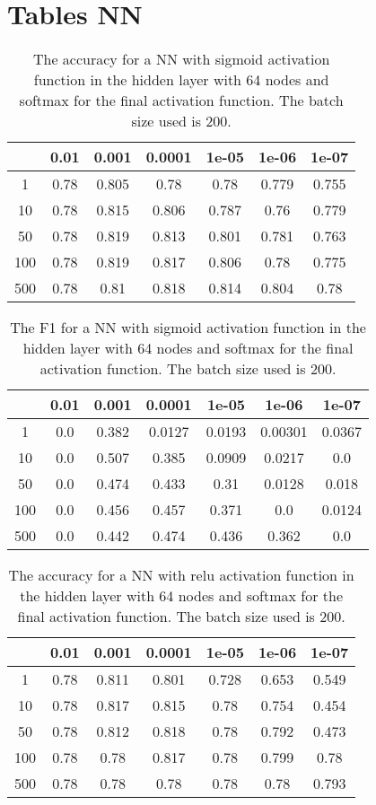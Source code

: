 \documentclass[uio,jmp,amsmath,amssymb,reprint,nofootinbib]{revtex4-1}
\numberwithin{equation}{section}
\begin{document}
\section{Tables NN}
\begin{table}[H]
\caption{The accuracy for a NN with sigmoid activation function in the hidden layer with 64 nodes and softmax for the final activation function. The batch size used is 200.}
\begin{tabular}{|c|c|c|c|c|c|c|}\hline
  & 0.01 & 0.001 & 0.0001 & 1e-05 & 1e-06 & 1e-07 \\ \hline
1 & 0.78 & 0.805 & 0.78 & 0.78 & 0.779 & 0.755 \\ \hline
10 & 0.78 & 0.815 & 0.806 & 0.787 & 0.76 & 0.779 \\ \hline
50 & 0.78 & 0.819 & 0.813 & 0.801 & 0.781 & 0.763 \\ \hline
100 & 0.78 & 0.819 & 0.817 & 0.806 & 0.78 & 0.775 \\ \hline
500 & 0.78 & 0.81 & 0.818 & 0.814 & 0.804 & 0.78 \\ \hline
\end{tabular}
\label{tab:11}
\end{table}

\begin{table}[H]
\caption{The F1 for a NN with sigmoid activation function in the hidden layer with 64 nodes and softmax for the final activation function. The batch size used is 200.}
\begin{tabular}{|c|c|c|c|c|c|c|}\hline
  & 0.01 & 0.001 & 0.0001 & 1e-05 & 1e-06 & 1e-07 \\ \hline
1 & 0.0 & 0.382 & 0.0127 & 0.0193 & 0.00301 & 0.0367 \\ \hline
10 & 0.0 & 0.507 & 0.385 & 0.0909 & 0.0217 & 0.0 \\ \hline
50 & 0.0 & 0.474 & 0.433 & 0.31 & 0.0128 & 0.018 \\ \hline
100 & 0.0 & 0.456 & 0.457 & 0.371 & 0.0 & 0.0124 \\ \hline
500 & 0.0 & 0.442 & 0.474 & 0.436 & 0.362 & 0.0 \\ \hline
\end{tabular}
\label{tab:12}
\end{table}


\begin{table}[H]
\caption{The accuracy for a NN with relu activation function in the hidden layer with 64 nodes and softmax for the final activation function. The batch size used is 200.}
\begin{tabular}{|c|c|c|c|c|c|c|}\hline
  & 0.01 & 0.001 & 0.0001 & 1e-05 & 1e-06 & 1e-07 \\ \hline
1 & 0.78 & 0.811 & 0.801 & 0.728 & 0.653 & 0.549 \\ \hline
10 & 0.78 & 0.817 & 0.815 & 0.78 & 0.754 & 0.454 \\ \hline
50 & 0.78 & 0.812 & 0.818 & 0.78 & 0.792 & 0.473 \\ \hline
100 & 0.78 & 0.78 & 0.817 & 0.78 & 0.799 & 0.78 \\ \hline
500 & 0.78 & 0.78 & 0.78 & 0.78 & 0.78 & 0.793 \\ \hline
\end{tabular}
\label{tab:13}
\end{table}
\end{document}
